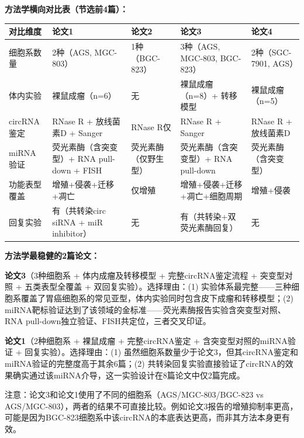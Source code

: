 \begin{aibox}
\textbf{方法学横向对比表（节选前4篇）：}

\begin{formalTable}[H]
\small
\begin{tabular}{p{2.8cm} p{2.5cm} p{2.5cm} p{2.5cm} p{2.5cm}}
\toprule
\textbf{对比维度} & \textbf{论文1} & \textbf{论文2} & \textbf{论文3} & \textbf{论文4} \\
\midrule
细胞系数量 & 2种（AGS, MGC-803） & 1种（BGC-823） & 3种（AGS, MGC-803, BGC-823） & 2种（SGC-7901, AGS） \\
体内实验 & 裸鼠成瘤（n=6） & 无 & 裸鼠成瘤（n=8）+ 转移模型 & 裸鼠成瘤（n=5） \\
circRNA鉴定 & RNase R + 放线菌素D + Sanger & RNase R仅 & RNase R + Sanger & RNase R + 放线菌素D \\
miRNA验证 & 荧光素酶（含突变型）+ RNA pull-down + FISH & 荧光素酶（仅野生型） & 荧光素酶（含突变型）+ RNA pull-down & 荧光素酶（含突变型） \\
功能表型覆盖 & 增殖+侵袭+迁移+凋亡 & 仅增殖 & 增殖+侵袭+迁移+凋亡+细胞周期 & 增殖+侵袭 \\
回复实验 & 有（共转染circ siRNA + miR inhibitor） & 无 & 有（共转染+双荧光素酶回复） & 无 \\
\bottomrule
\end{tabular}
\end{formalTable}

\smallskip
\textbf{方法学最稳健的2篇论文：}

\textbf{论文3}（3种细胞系 + 体内成瘤及转移模型 + 完整circRNA鉴定流程 + 突变型对照 + 五类表型全覆盖 + 双回复实验）。选择理由：(1) 实验体系最完整——三种细胞系覆盖了胃癌细胞系的常见亚型，体内实验同时包含皮下成瘤和转移模型；(2) miRNA靶标验证达到了该领域的金标准——荧光素酶报告实验含突变型对照、RNA pull-down独立验证、FISH共定位，三者交叉印证。

\textbf{论文1}（2种细胞系 + 裸鼠成瘤 + 完整circRNA鉴定 + 含突变型对照的miRNA验证 + 回复实验）。选择理由：(1) 虽然细胞系数量少于论文3，但其circRNA鉴定和miRNA验证的完整度高于其余6篇；(2) 共转染回复实验直接验证了circRNA的效果确实通过该miRNA介导，这一实验设计在8篇论文中仅2篇完成。

注意：论文3和论文1使用了不同的细胞系（AGS/MGC-803/BGC-823 vs AGS/MGC-803），两者的结果不可直接比较。例如论文3报告的增殖抑制率更高，可能是因为BGC-823细胞系中该circRNA的本底表达更高，而非其方法本身更有效。
\end{aibox}

